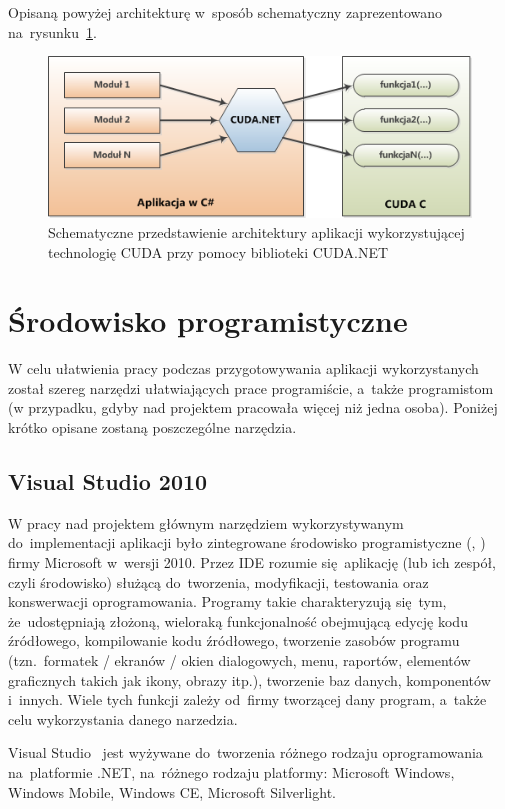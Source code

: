 Opisaną powyżej architekturę w~sposób schematyczny zaprezentowano na~rysunku~\ref{rys:arch_cuda_net}.

\begin{figure}[ht]
\centering
\includegraphics{figures/04/arch_cuda_net.png}
\caption{Schematyczne przedstawienie architektury aplikacji wykorzystującej technologię CUDA przy pomocy biblioteki CUDA.NET}\label{rys:arch_cuda_net}
\end{figure}

\section{Środowisko programistyczne}
W celu ułatwienia pracy podczas przygotowywania aplikacji wykorzystanych został szereg narzędzi ułatwiających prace programiście, a~także programistom (w przypadku, gdyby nad projektem pracowała więcej niż jedna osoba). Poniżej krótko opisane zostaną poszczególne narzędzia.

\subsection{Visual Studio 2010}
W pracy nad projektem głównym narzędziem wykorzystywanym do~implementacji aplikacji było zintegrowane środowisko programistyczne (, ) firmy Microsoft w~wersji 2010. Przez IDE rozumie się~aplikację (lub ich zespół, czyli środowisko) służącą do~tworzenia, modyfikacji, testowania oraz konswerwacji oprogramowania. Programy takie charakteryzują się~tym, że~udostępniają złożoną, wieloraką funkcjonalność obejmującą edycję kodu źródłowego, kompilowanie kodu źródłowego, tworzenie zasobów programu (tzn.~formatek / ekranów / okien dialogowych, menu, raportów, elementów graficznych takich jak ikony, obrazy itp.), tworzenie baz danych, komponentów i~innych. Wiele tych funkcji zależy od~firmy tworzącej dany program, a~także celu wykorzystania danego narzedzia.

Visual Studio~\cite{ms:visualStudio} jest wyżywane do~tworzenia różnego rodzaju oprogramowania na~platformie .NET, na~różnego rodzaju platformy: Microsoft Windows, Windows Mobile, Windows CE, Microsoft Silverlight.


